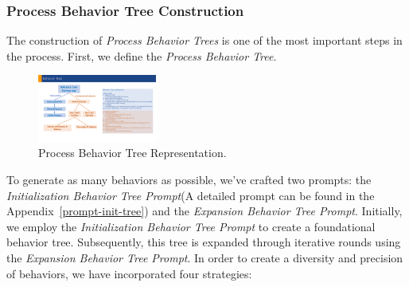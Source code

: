 
\subsubsection{Process Behavior Tree Construction}
The construction of \textit{Process Behavior Trees} is one of the most important steps in the process.
First, we define the \textit{Process Behavior Tree}.

\begin{figure}[h]
    \centering
      \includegraphics[width=0.35\textwidth]{figs/tree1.pdf}
    \caption{Process Behavior Tree Representation.}
    \label{fig:BT}
\end{figure}



To generate as many behaviors as possible, we've crafted two prompts: the \textit{Initialization Behavior Tree Prompt}(A detailed prompt can be found in the Appendix~\ref{prompt-init-tree}) and the \textit{Expansion Behavior Tree Prompt}. Initially, we employ the \textit{Initialization Behavior Tree Prompt} to create a foundational behavior tree. Subsequently, this tree is expanded through iterative rounds using the \textit{Expansion Behavior Tree Prompt}. In order to create a diversity and precision of behaviors, we have incorporated four strategies:

